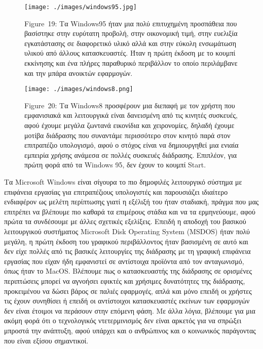 \documentclass[
]{article}
\begin{document}
\leavevmode{}%
\begin{figure}
\hypertarget{fig:windows95}{%
\centering
\texttt{[image: ./images/windows95.jpg]}
\caption{Figure~19: Τα Windows95 ήταν μια πολύ επιτυχημένη προσπάθεια
που βασίστηκε στην ευρύτατη προβολή, στην οικονομική τιμή, στην ευελιξία
εγκατάστασης σε διαφορετικό υλικό αλλά και στην εύκολη ενσωμάτωση υλικού
από άλλους κατασκευαστές. Ήταν η πρώτη έκδοση με το κουμπί εκκίνησης και
ένα πλήρες παραθυρικό περιβάλλον το οποίο περιλάμβανε και την μπάρα
ανοικτών εφαρμογών.}\label{fig:windows95}
}
\end{figure}

\leavevmode{}%
\begin{figure}
\hypertarget{fig:windows8}{%
\centering
\texttt{[image: ./images/windows8.png]}
\caption{Figure~20: Τα Windows8 προσφέρουν μια διεπαφή με τον χρήστη που
εμφανισιακά και λειτουργικά είναι δανεισμένη από τις κινητές συσκευές,
αφού έχουμε μεγάλα ζωντανά εικονίδια και χειρονομίες, δηλαδή έχουμε
μοτίβα διάδρασης που συναντάμε περισσότερο στον κινητό παρά στον
επιτραπέζιο υπολογισμό, αφού ο στόχος είναι να δημιουργηθεί μια ενιαία
εμπειρία χρήσης ανάμεσα σε πολλές συσκευές διάδρασης. Επιπλέον, για
πρώτη φορά από τα Windows 95, δεν έχουν το κουμπί
Start.}\label{fig:windows8}
}
\end{figure}

Τα Microsoft Windows είναι σίγουρα το πιο δημοφιλές λειτουργικό σύστημα
με επιφάνεια εργασίας για επιτραπέζιους υπολογιστές και παρουσιάζει
ιδιαίτερο ενδιαφέρον ως μελέτη περίπτωσης γιατί η εξέλιξή του ήταν
σταδιακή, πράγμα που μας επιτρέπει να βλέπουμε πιο καθαρά τα επιμέρους
στάδια και να τα ερμηνεύουμε, αφού πρώτα τα συνδέσουμε με άλλες σχετικές
εξελίξεις. Επειδή η αποδοχή του βασικού λειτουργικού συστήματος
Microsoft Disk Operating System (MSDOS) ήταν πολύ μεγάλη, η πρώτη έκδοση
του γραφικού περιβάλλοντος ήταν βασισμένη σε αυτό και δεν είχε πολλές
από τις βασικές λειτουργίες της διάδρασης με τη γραφική επιφάνεια
εργασίας που είχαν ήδη εμφανιστεί σε αντίστοιχα προϊόντα από τον
ανταγωνισμό, όπως ήταν το MacOS. Βλέπουμε πως ο κατασκευαστής της
διάδρασης σε ορισμένες περιπτώσεις μπορεί να αγνοήσει εφικτές και
χρήσιμες δυνατότητες της διάδρασης, προκειμένου να δώσει βάρος σε παλιές
εφαρμογές, απλά και μόνο επειδή οι χρήστες τις έχουν συνηθίσει ή επειδή
οι αντίστοιχοι κατασκευαστές εκείνων των εφαρμογών δεν είναι έτοιμοι να
περάσουν στην επόμενη φάση. Με άλλα λόγια, βλέπουμε για μια ακόμη φορά
ότι ο τεχνολογικός ντετερμινισμός δεν είναι αρκετός για να σπρώξει
μπροστά την ανάπτυξη, αφού υπάρχει και ο ανθρώπινος και ο κοινωνικός
παράγοντας που είναι εξίσου σημαντικοί.
\end{document}
